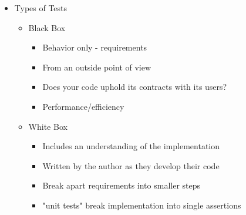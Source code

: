 \begin{section}
    \begin{itemize}
        \item Types of Tests
        \begin{itemize}
            \item Black Box
            \begin{itemize}
                \item Behavior only - requirements
                \item From an outside point of view
                \item Does your code uphold its contracts with its users?
                \item Performance/efficiency
            \end{itemize}
            \item White Box
            \begin{itemize}
                \item Includes an understanding of the implementation
                \item Written by the author as they develop their code
                \item Break apart requirements into smaller steps
                \item "unit tests" break implementation into single assertions
            \end{itemize}
        \end{itemize}
    \end{itemize}
    

\end{section}
